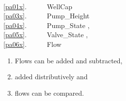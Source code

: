 \mnewfoil\LLLL\HHHH%

\bp
\>\ \\
\ref{pa01x}.\ \ \ \ \ \ WellCap \\
\ref{pa03x}.\ \ \ \ \ \ Pump\_Height \\
\ref{pa04x}.\ \ \ \ \ \ Pump\_State {\EQ}{\EQ} {\LBRACE}{\BAR}, \\
\ref{pa05x}.\ \ \ \ \ \ Valve\_State {\EQ}{\EQ} {\LBRACE}{\BAR}, \\
\ref{pa06x}.\ \ \ \ \ \ Flow 
\ep
\begin{enumerate}\setei
\item \label{pa05y1} Flows can be added and subtracted,
\item \label{pa05y2} added distributively  and
\item \label{pa05z} flows can be compared.
\savei\end{enumerate}

